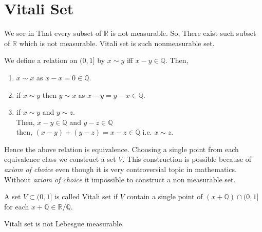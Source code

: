 \section{Vitali Set}
We see in  That every subset of $\mathds{R}$ is not measurable. So, There exist such subset of $\mathds{R}$ which is not measurable.
Vitali set is such nonmeasurable set.

We define a relation on $(0,1]$ by  $x\sim y$ iff  $x-y\in\mathds{Q}$. Then,
\begin{enumerate}
    \item $x\sim x$ as  $x-x=0\in\mathds{Q}$.
    \item if $x\sim y$ then $y\sim x$ as $x-y=y-x\in\mathds{Q}$.
    \item if $x\sim y$ and  $y\sim z$.\\
         Then, $x-y\in\mathds{Q}$ and $y-z\in\mathds{Q}$ \\
         then, $(x-y)+(y-z)=x-z\in\mathds{Q}$ i.e. $x\sim z$.
\end{enumerate}
Hence the above relation is equivalence. Choosing a single point from each equivalence class we construct a set $V$. This construction is possible because of \textit{axiom
of choice} even though it is very controversial topic in mathematics. Without \textit{axiom of choice} it impossible to construct a non measurable set. 
\begin{definition}
    A set $V\subset(0,1]$ is called Vitali set if  $V$ contain a single point of  $(x+\mathds{Q})\cap(0,1]$ for each $x+\mathds{Q}\in\mathds{R}/\mathds{Q}$.
\end{definition}
\begin{theorem}
    Vitali set is not Lebesgue measurable.
\end{theorem}
